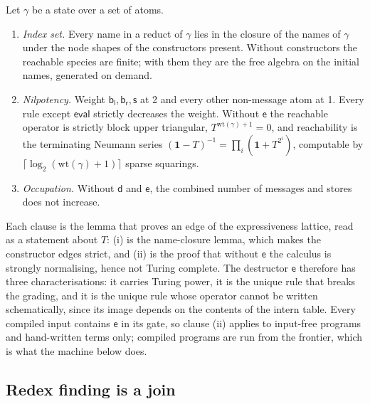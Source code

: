 \documentclass[acmsmall,screen,review,anonymous]{acmart}
\newcommand{\dd}{\mathsf{d}}
\newcommand{\bl}{\mathsf{b}_{\mathsf{l}}}
\newcommand{\br}{\mathsf{b}_{\mathsf{r}}}
\newcommand{\sy}{\mathsf{s}}
\newcommand{\ev}{\mathsf{e}}
\newcommand{\Wt}{\mathrm{wt}}
\begin{document}
\begin{theorem}
\label{thm:three}
Let $\gamma$ be a state over a set of atoms.
\begin{enumerate}[label=(\roman*),leftmargin=2.2em]
\item \emph{Index set.} Every name in a reduct of $\gamma$ lies in the closure
  of the names of $\gamma$ under the node shapes of the constructors present.
  Without constructors the reachable species are finite; with them they are
  the free algebra on the initial names, generated on demand.
\item \emph{Nilpotency.} Weight $\bl,\br,\sy$ at 2 and every other non-message
  atom at 1. Every rule except $\mathsf{eval}$ strictly decreases the weight.
  Without $\ev$ the reachable operator is strictly block upper triangular,
  $T^{\Wt(\gamma)+1} = 0$, and reachability is the terminating Neumann series
  $(\mathbf{1}-T)^{-1} = \prod_{i} (\mathbf{1} + T^{2^{i}})$, computable by
  $\lceil \log_{2}(\Wt(\gamma)+1)\rceil$ sparse squarings.
\item \emph{Occupation.} Without $\dd$ and $\ev$, the combined number of
  messages and stores does not increase.
\end{enumerate}
\end{theorem}

Each clause is the lemma that proves an edge of the expressiveness lattice,
read as a statement about $T$: (i) is the name-closure lemma, which makes the
constructor edges strict, and (ii) is the proof that without $\ev$ the
calculus is strongly normalising, hence not Turing complete. The destructor
$\ev$ therefore has three characterisations: it carries Turing power, it is
the unique rule that breaks the grading, and it is the unique rule whose
operator cannot be written schematically, since its image depends on the
contents of the intern table. Every compiled input contains $\ev$ in its gate,
so clause (ii) applies to input-free programs and hand-written terms only;
compiled programs are run from the frontier, which is what the machine below
does.

\subsection{Redex finding is a join}
\label{sec:joins}
\end{document}
